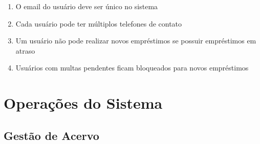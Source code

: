 \documentclass[12pt,a4paper]{article}
\begin{document}
\begin{conceptbox}
\begin{enumerate}[label=\textbf{RU\arabic*.}]
    \item O email do usuário deve ser único no sistema
    \item Cada usuário pode ter múltiplos telefones de contato
    \item Um usuário não pode realizar novos empréstimos se possuir empréstimos em atraso
    \item Usuários com multas pendentes ficam bloqueados para novos empréstimos
\end{enumerate}
\end{conceptbox}

\section{Operações do Sistema}

\subsection{Gestão de Acervo}
\end{document}
